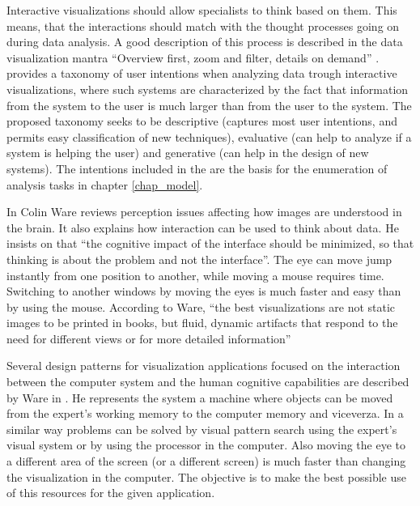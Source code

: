 Interactive visualizations should allow specialists to think based on them. This means, that the interactions should match with the thought processes going on during data analysis. A good description of this process is described in the data visualization mantra ``Overview first, zoom and filter, details on demand'' \autocite{schneiderman_designing_1998}. \autocite{yi_toward_2007} provides a taxonomy of user intentions when analyzing data trough interactive visualizations, where such systems are characterized by the fact that information from the system to the user is much larger than from the user to the system. The proposed taxonomy seeks to be descriptive (captures most user intentions, and permits easy classification of new techniques), evaluative (can help to analyze if a system is helping the user) and generative (can help in the design of new systems). The intentions included in the are the basis for the enumeration of analysis tasks in chapter \ref{chap_model}.

In \autocite{ware_information_2004} Colin Ware reviews perception issues affecting how images are understood in the brain. It also explains how interaction can be used to think about data. He insists on that ``the cognitive impact of the interface should be minimized, so that thinking is about the problem and not the interface''. The eye can move jump instantly from one position to another, while moving a mouse requires time. Switching to another windows by moving the eyes is much faster and easy than by using the mouse. According to Ware, ``the best visualizations are not static images to be printed in books, but fluid, dynamic artifacts that respond to the need for different views or for more detailed information''

Several design patterns for visualization applications focused on the interaction between the computer system and the human cognitive capabilities are described by Ware in \autocite{ware_visual_2013}. He represents the system a machine where objects can be moved from the expert's working memory to the computer memory and viceverza. In a similar way problems can be solved by visual pattern search using the expert's visual system or by using the processor in the computer. Also moving the eye to a different area of the screen (or a different screen) is much faster than changing the visualization in the computer. The objective is to make the best possible use of this resources for the given application. 


